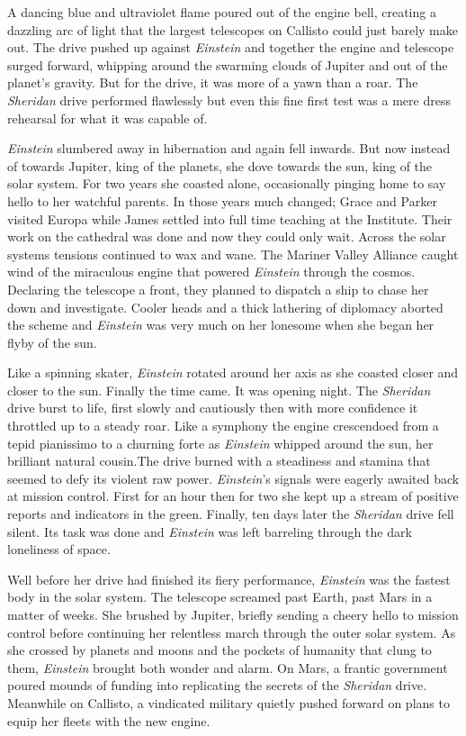 \documentclass[12pt]{article} %
\begin{document}
A dancing blue and ultraviolet flame poured out of the engine bell, creating a dazzling arc of light that the largest telescopes on Callisto could just barely make out. The drive pushed up against \textit{Einstein} and together the engine and telescope surged forward, whipping around the swarming clouds of Jupiter and out of the planet's gravity. But for the drive, it was more of a yawn than a roar. The \textit{Sheridan} drive performed flawlessly but even this fine first test was a mere dress rehearsal for what it was capable of.

\textit{Einstein} slumbered away in hibernation and again fell inwards. But now instead of towards Jupiter, king of the planets, she dove towards the sun, king of the solar system. For two years she coasted alone, occasionally pinging home to say hello to her watchful parents. In those years much changed; Grace and Parker visited Europa while James settled into full time teaching at the Institute. Their work on the cathedral was done and now they could only wait. Across the solar systems tensions continued to wax and wane. The Mariner Valley Alliance caught wind of the miraculous engine that powered \textit{Einstein} through the cosmos. Declaring the telescope a front, they planned to dispatch a ship to chase her down and investigate. Cooler heads and a thick lathering of diplomacy aborted the scheme and \textit{Einstein} was very much on her lonesome when she began her flyby of the sun.

Like a spinning skater, \textit{Einstein} rotated around her axis as she coasted closer and closer to the sun. Finally the time came. It was opening night. The \textit{Sheridan} drive burst to life, first slowly and cautiously then with more confidence it throttled up to a steady roar. Like a symphony the engine crescendoed from a tepid pianissimo to a churning forte as \textit{Einstein} whipped around the sun, her brilliant natural cousin.The drive burned with a steadiness and stamina that seemed to defy its violent raw power. \textit{Einstein}'s signals were eagerly awaited back at mission control. First for an hour then for two she kept up a stream of positive reports and indicators in the green. Finally, ten days later the \textit{Sheridan} drive fell silent. Its task was done and \textit{Einstein} was left barreling through the dark loneliness of space.

Well before her drive had finished its fiery performance, \textit{Einstein} was the fastest body in the solar system. The telescope screamed past Earth, past Mars in a matter of weeks. She brushed by Jupiter, briefly sending a cheery hello to mission control before continuing her relentless march through the outer solar system. As she crossed by planets and moons and the pockets of humanity that clung to them, \textit{Einstein} brought both wonder and alarm. On Mars, a frantic government poured mounds of funding into replicating the secrets of the \textit{Sheridan} drive. Meanwhile on Callisto, a vindicated military quietly pushed forward on plans to equip her fleets with the new engine.
\end{document}
